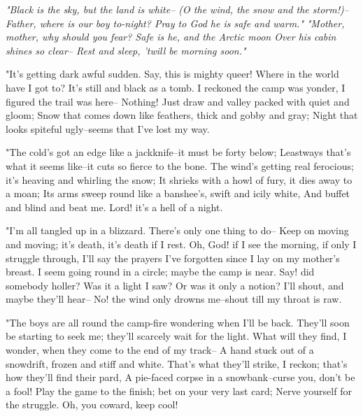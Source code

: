 
\begin{poemblock}
\textit{
  "Black is the sky, but the land is white--
   (O the wind, the snow and the storm!)--
  Father, where is our boy to-night?
   Pray to God he is safe and warm."
}
\textit{
  "Mother, mother, why should you fear?
   Safe is he, and the Arctic moon
  Over his cabin shines so clear--
   Rest and sleep, 'twill be morning soon."
}

 "It's getting dark awful sudden.  Say, this is mighty queer!
  Where in the world have I got to?  It's still and black as a tomb.
 I reckoned the camp was yonder, I figured the trail was here--
  Nothing!  Just draw and valley packed with quiet and gloom;
 Snow that comes down like feathers, thick and gobby and gray;
 Night that looks spiteful ugly--seems that I've lost my way.

 "The cold's got an edge like a jackknife--it must be forty below;
  Leastways that's what it seems like--it cuts so fierce to the bone.
 The wind's getting real ferocious; it's heaving and whirling the snow;
  It shrieks with a howl of fury, it dies away to a moan;
 Its arms sweep round like a banshee's, swift and icily white,
 And buffet and blind and beat me.  Lord! it's a hell of a night.

 "I'm all tangled up in a blizzard.  There's only one thing to do--
  Keep on moving and moving; it's death, it's death if I rest.
 Oh, God! if I see the morning, if only I struggle through,
  I'll say the prayers I've forgotten since I lay on my mother's breast.
 I seem going round in a circle; maybe the camp is near.
  Say! did somebody holler?  Was it a light I saw?
 Or was it only a notion?  I'll shout, and maybe they'll hear--
  No! the wind only drowns me--shout till my throat is raw.

 "The boys are all round the camp-fire wondering when I'll be back.
  They'll soon be starting to seek me; they'll scarcely wait for the light.
 What will they find, I wonder, when they come to the end of my track--
  A hand stuck out of a snowdrift, frozen and stiff and white.
 That's what they'll strike, I reckon; that's how they'll find their pard,
  A pie-faced corpse in a snowbank--curse you, don't be a fool!
 Play the game to the finish; bet on your very last card;
  Nerve yourself for the struggle.  Oh, you coward, keep cool!


\end{poemblock}
